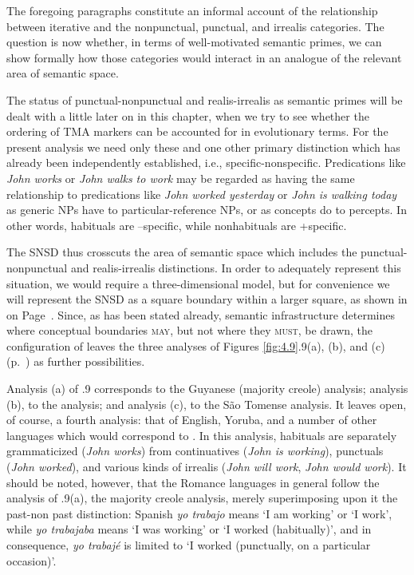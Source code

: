 The foregoing paragraphs constitute an informal account of the relationship between iterative and the nonpunctual, punctual, and irrealis categories. The question is now whether, in terms of well-motivated semantic primes, we can show formally how those categories would interact in an analogue of the relevant area of semantic space.

The status of punc\-tu\-al-nonpunctual and realis-irrealis as semantic primes will be dealt with a little later on in this chapter, when we try to see whether the ordering of TMA markers can be accounted for in evolutionary terms. For the present analysis we need only these and one other primary distinction which has already been independently established, i.e., specific-nonspecific. Predications like  \textit{John works} or
\textit{John walks to work} may be regarded as having the same relationship to predications like \textit{John worked yesterday} or \textit{John is walking today} as generic NPs have to particular-reference NPs, or as concepts do to percepts. In other words, habituals are --specific, while nonhabituals are +specific.

The SNSD thus crosscuts the area of semantic space which includes the punctual-nonpunctual and realis-irrealis distinctions. In order to adequately represent this situation, we would require a three-dimensional model, but for convenience we will represent the SNSD as a square boundary within a larger square, as shown in  on Page~\pageref{fig:4.8}. Since, as has been stated already, semantic infrastructure determines where conceptual boundaries \textsc{may}, but not where they \textsc{must}, be drawn, the configuration of  leaves the three analyses of Figures \ref{fig:4.9}.9(a), (b), and (c) (p.~\pageref{fig:4.9}) as further possibilities.

Analysis (a) of .9 corresponds to the Guyanese (majority creole) analysis; analysis (b), to the  analysis; and analysis (c), to the S{\~a}o Tomense analysis. It leaves open, of course, a fourth analysis: that of English, Yoruba, and a number of other languages which would correspond to . In this analysis, habituals are separately grammaticized (\textit{John works}) from continuatives (\textit{John is working}), punctuals (\textit{John worked}), and various kinds of irrealis (\textit{John will work}, \textit{John would work}). It should be noted, however, that the Romance languages in general follow the analysis of .9(a), the majority creole analysis, merely superimposing upon it the past-non past distinction: Spanish \textit{yo  trabajo} means `I am working' or `I work', while \textit{yo trabajaba} means `I was working' or `I worked (habitually)', and in consequence, \textit{yo trabajé} is limited to `I worked (punctually, on a particular occasion)'.\\\\

